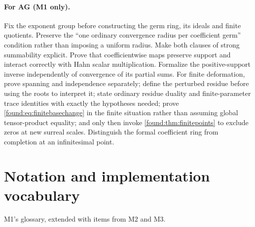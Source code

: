 \documentclass[11pt,letterpaper]{article}
\numberwithin{equation}{section}
\theoremstyle{definition}
\theoremstyle{remark}
\begin{document}
\paragraph{For AG (M1 only).} Fix the exponent group before constructing the
germ ring, its ideals and finite quotients. Preserve the ``one ordinary
convergence radius per coefficient germ'' condition rather than imposing a
uniform radius. Make both clauses of strong summability explicit. Prove that
coefficientwise maps preserve support and interact correctly with Hahn scalar
multiplication. Formalize the positive-support inverse independently of
convergence of its partial sums. For finite deformation, prove spanning and
independence separately; define the perturbed residue before using the roots to
interpret it; state ordinary residue duality and finite-parameter trace
identities with exactly the hypotheses needed; prove
\eqref{found:eq:finitebasechange} in the finite situation rather than assuming
global tensor-product equality; and only then invoke
\cref{found:thm:finitepoints} to exclude zeros at new surreal scales.
Distinguish the formal coefficient ring from completion at an infinitesimal
point.

\section{Notation and implementation vocabulary}
\label{found:app:notation}

M1's glossary, extended with items from M2 and M3.
\end{document}

